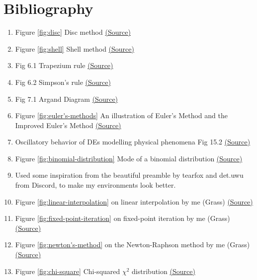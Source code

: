 \documentclass[oneside]{book}
\begin{document}
\chapter{Bibliography}
\begin{enumerate}
  \item Figure \ref{fig:disc} Disc method \href{https://tex.stackexchange.com/a/391013}{(Source)}
  \item Figure \ref{fig:shell} Shell method \href{https://tex.stackexchange.com/a/404849}{(Source)}
  \item Fig 6.1 Trapezium rule \href{https://tex.stackexchange.com/a/110618}{(Source)}
  \item Fig 6.2 Simpson's rule \href{https://tex.stackexchange.com/a/439119}{(Source)}
  \item Fig 7.1 Argand Diagram \href{https://tex.stackexchange.com/a/466846}{(Source)}
  \item Figure \ref{fig:euler's-methods} An illustration of Euler's Method and the Improved Euler's Method \href{https://tex.stackexchange.com/a/639280}{(Source)}
  \item Oscillatory behavior of DEs modelling physical phenomena Fig 15.2 \href{https://tikz.net/dynamics_oscillator/}{(Source)}
  \item Figure \ref{fig:binomial-distribution} Mode of a binomial distribution \href{https://tex.stackexchange.com/a/209658}{(Source)}
  \item Used some inspiration from the beautiful preamble by tearfox and det.uwu from Discord, to make my environments look better.
  \item Figure \ref{fig:linear-interpolation} on linear interpolation by me (Grass) \href{https://www.desmos.com/calculator/jp52nra5le}{(Source)}
  \item Figure \ref{fig:fixed-point-iteration} on fixed-point iteration by me (Grass) \href{https://www.desmos.com/calculator/t9mnqtmhxw}{(Source)}
  \item Figure \ref{fig:newton's-method} on the Newton-Raphson method by me (Grass) \href{https://www.desmos.com/calculator/izkg4ynlfp}{(Source)}
  \item Figure \ref{fig:chi-square} Chi-squared \(\chi^2\) distribution \href{https://commons.wikimedia.org/wiki/File:Chi-square_pdf.svg}{(Source)}
\end{enumerate}
\end{document}
